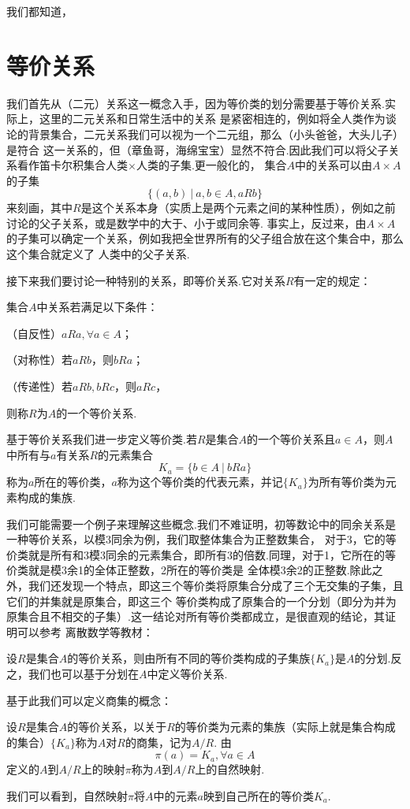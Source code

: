 我们都知道，

\section{等价关系}
我们首先从（二元）关系这一概念入手，因为等价类的划分需要基于等价关系.实际上，这里的二元关系和日常生活中的关系
是紧密相连的，例如将全人类作为谈论的背景集合，二元关系我们可以视为一个二元组，那么（小头爸爸，大头儿子）是符合
这一关系的，但（章鱼哥，海绵宝宝）显然不符合.因此我们可以将父子关系看作笛卡尔积集合人类$\times$人类的子集.更一般化的，
集合$A$中的关系可以由$A\times A$的子集$$\{(a,b)\ |\ a,b\in A,aRb\}$$
来刻画，其中$R$是这个关系本身（实质上是两个元素之间的某种性质），例如之前讨论的父子关系，或是数学中的大于、小于或同余等.
事实上，反过来，由$A\times A$的子集可以确定一个关系，例如我把全世界所有的父子组合放在这个集合中，那么这个集合就定义了
人类中的父子关系.

接下来我们要讨论一种特别的关系，即等价关系.它对关系$R$有一定的规定：
\begin{definition}
	集合$A$中关系若满足以下条件：

	（自反性）$aRa,\forall a\in A$；

	（对称性）若$aRb$，则$bRa$；

	（传递性）若$aRb,bRc$，则$aRc$，

	则称$R$为$A$的一个等价关系.
\end{definition}
基于等价关系我们进一步定义等价类.若$R$是集合$A$的一个等价关系且$a\in A$，则$A$中所有与$a$有关系$R$的元素集合
$$K_a=\{b\in A\ |\ bRa\}$$称为$a$所在的等价类，$a$称为这个等价类的代表元素，并记$\{K_a\}$为所有等价类为元素构成的集族.

我们可能需要一个例子来理解这些概念.我们不难证明，初等数论中的同余关系是一种等价关系，以模3同余为例，我们取整体集合为正整数集合，
对于3，它的等价类就是所有和3模3同余的元素集合，即所有3的倍数.同理，对于1，它所在的等价类就是模3余1的全体正整数，2所在的等价类是
全体模3余2的正整数.除此之外，我们还发现一个特点，即这三个等价类将原集合分成了三个无交集的子集，且它们的并集就是原集合，即这三个
等价类构成了原集合的一个\textup{分划}（即分为并为原集合且不相交的子集）.这一结论对所有等价类都成立，是很直观的结论，其证明可以参考
离散数学等教材：
\begin{theorem}
	设$R$是集合$A$的等价关系，则由所有不同的等价类构成的子集族$\{K_a\}$是$A$的分划.反之，我们也可以基于分划在$A$中定义等价关系.
\end{theorem}
基于此我们可以定义\textup{商集}的概念：
\begin{definition}
	设$R$是集合$A$的等价关系，以关于$R$的等价类为元素的集族（实际上就是集合构成的集合）$\{K_a\}$称为$A$对$R$的商集，记为$A/R$.
	由$$\pi(a)=K_a,\forall a\in A$$定义的$A$到$A/R$上的映射$\pi$称为$A$到$A/R$上的自然映射.
\end{definition}
我们可以看到，自然映射$\pi$将$A$中的元素$a$映到自己所在的等价类$K_a$.

